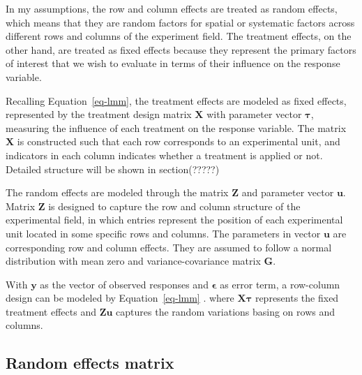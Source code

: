 \documentclass[
  a4paper,
  oneside,
  openany,
  12pt,
  onecolumn]{book}
\theoremstyle{plain}
\theoremstyle{definition}
\theoremstyle{remark}
\begin{document}
In my assumptions, the row and column effects are treated as random
effects, which means that they are random factors for spatial or
systematic factors across different rows and columns of the experiment
field. The treatment effects, on the other hand, are treated as fixed
effects because they represent the primary factors of interest that we
wish to evaluate in terms of their influence on the response variable.

Recalling Equation~\ref{eq-lmm}, the treatment effects are modeled as
fixed effects, represented by the treatment design matrix
\(\boldsymbol{X}\) with parameter vector \(\boldsymbol{\tau}\),
measuring the influence of each treatment on the response variable. The
matrix \(\boldsymbol{X}\) is constructed such that each row corresponds
to an experimental unit, and indicators in each column indicates whether
a treatment is applied or not. Detailed structure will be shown in
section(?????)

The random effects are modeled through the matrix \(\boldsymbol{Z}\) and
parameter vector \(\boldsymbol{u}\). Matrix \(\boldsymbol{Z}\) is
designed to capture the row and column structure of the experimental
field, in which entries represent the position of each experimental unit
located in some specific rows and columns. The parameters in vector
\(\boldsymbol{u}\) are corresponding row and column effects. They are
assumed to follow a normal distribution with mean zero and
variance-covariance matrix \(\boldsymbol{G}\).

With \(\boldsymbol{y}\) as the vector of observed responses and
\(\boldsymbol{\epsilon}\) as error term, a row-column design can be
modeled by Equation~\ref{eq-lmm} . where \(\boldsymbol{X\tau}\)
represents the fixed treatment effects and \(\boldsymbol{Zu}\) captures
the random variations basing on rows and columns.

\subsection{Random effects matrix}\label{random-effects-matrix}
\end{document}
